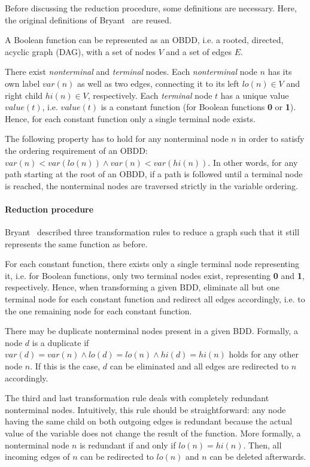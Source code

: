 \documentclass{vldb}
\begin{document}
Before discussing the reduction procedure, some definitions are necessary. Here,
the original definitions of Bryant~\cite{BRYANT86, BRYANT91} are reused.

A Boolean function can be represented as an OBDD, i.e. a rooted, directed,
acyclic graph (DAG), with a set of nodes $V$ and a set of edges $E$. 

There exist \textit{nonterminal} and \textit{terminal} nodes. Each
\textit{nonterminal} node $n$ has its own label $var(n)$ as well as two edges,
connecting it to its left $lo(n)\in V$ and right child $hi(n)\in V$, respectively. 
Each \textit{terminal} node $t$ has a unique value $value(t)$, i.e. $value(t)$
is a constant function (for Boolean functions \textbf{0} or \textbf{1}). Hence,
for each constant function only a single terminal node exists.

The following property has to hold for any nonterminal node $n$ in order to
satisfy the ordering requirement of an OBDD:
$var(n) < var(lo(n)) \land var(n) < var(hi(n))$.
In other words, for any path starting at the root of an OBDD, if a path is
followed until a terminal node is reached, the nonterminal nodes are traversed
strictly in the variable ordering.

\paragraph*{Reduction procedure}
\mbox{} %

Bryant~\cite{BRYANT86, BRYANT92} described three transformation rules to reduce
a graph such that it still represents the same function as before.

For each constant function, there exists only a single terminal node representing
it, i.e. for Boolean functions, only two terminal nodes exist, representing
\textbf{0} and \textbf{1}, respectively. Hence, when transforming a given BDD,
eliminate all but one terminal node for each constant function and redirect all
edges accordingly, i.e. to the one remaining node for each constant function.

There may be duplicate nonterminal nodes present in a given BDD. Formally, a node
$d$ is a duplicate if $var(d) = var(n) \land lo(d) = lo(n) \land hi(d) = hi(n)$
holds for any other node $n$. If this is the case, $d$ can be eliminated and all
edges are redirected to $n$ accordingly.

The third and last transformation rule deals with completely redundant nonterminal
nodes. Intuitively, this rule should be straightforward: any node having the same
child on both outgoing edges is redundant because the actual value of the variable
does not change the result of the function. More formally, a nonterminal node $n$
is redundant if and only if $lo(n) = hi(n)$. Then, all incoming edges of $n$ can
be redirected to $lo(n)$ and $n$ can be deleted afterwards.
\end{document}
